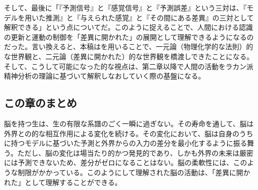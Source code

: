そして、最後に「『予測信号』と『感覚信号』と『予測誤差』という三対は、『モデルを用いた推測』と『与えられた感覚』と『その間にある差異』の三対として解釈できる」という点についてだ。このように捉えることで、人間における認識の更新と運動の制御を「差異に開かれた」の展開として理解できるようになるのだった。言い換えると、本稿はを用いることで、一元論（物理化学的な法則）的な世界観と、二元論（差異に開かれた）的な世界観を橋渡しできたことになる。そして、こうして可能になった的な視点は、第二章以降で人間の活動をラカン派精神分析の理論に基づいて解釈しなおしていく際の基盤になる。

\subsection{この章のまとめ}\label{ux3053ux306eux7ae0ux306eux307eux3068ux3081}

脳を持つ生は、生の有限な系譜のごく一瞬に過ぎない。その寿命を通して、脳は外界との的な相互作用による変化を続ける。その変化において、脳は自身のうちに持つモデルに基づいた予測と外界からの入力の差分を最小化するように振る舞う。ただし、脳の変化は場当たり的かつ発見的であり、しかも外界の未来は厳密には予測できないため、差分がゼロになることはない。脳の柔軟性には、このような制限がかかっている。このようにして理解された脳の活動は、「差異に開かれた」として理解することができる。
